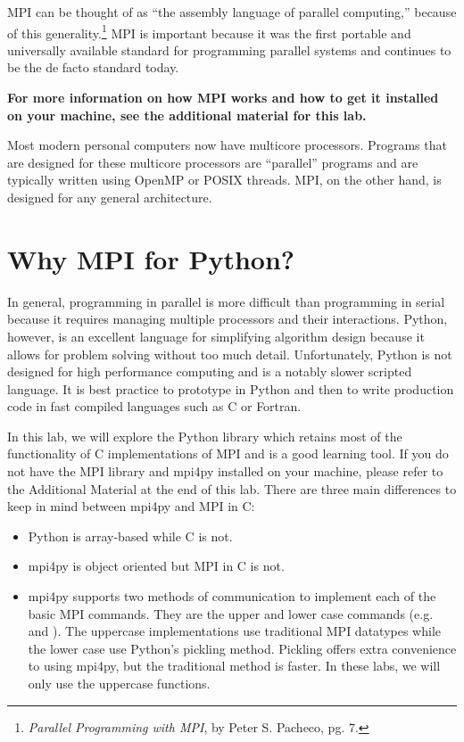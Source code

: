 MPI can be thought of as ``the assembly language of parallel computing,'' because of this generality.\footnote{\emph{Parallel Programming with MPI}, by Peter S. Pacheco, pg. 7.}
MPI is important because it was the first portable and universally available standard for programming parallel systems and continues to be the de facto standard today.

\textbf{For more information on how MPI works and how to get it installed on your machine, see the additional material for this lab.}
\begin{info}
Most modern personal computers now have multicore processors.
Programs that are designed for these multicore processors are ``parallel'' programs and are typically written using OpenMP or POSIX threads.
MPI, on the other hand, is designed for any general architecture.
\end{info}

\section*{Why MPI for Python?}
In general, programming in parallel is more difficult than programming in serial because it requires managing multiple processors and their interactions.
Python, however, is an excellent language for simplifying algorithm design because it allows for problem solving without too much detail.
Unfortunately, Python is not designed for high performance computing and is a notably slower scripted language.
It is best practice to prototype in Python and then to write production code in fast compiled languages such as C or Fortran.

In this lab, we will explore the Python library  which retains most of the functionality of C implementations of MPI and is a good learning tool.
If you do not have the MPI library and mpi4py installed on your machine, please refer to the Additional Material at the end of this lab.
There are three main differences to keep in mind between mpi4py and MPI in C:
\begin{itemize}
    \item Python is array-based while C is not.
    \item mpi4py is object oriented but MPI in C is not.
    \item mpi4py supports two methods of communication to implement each of the basic MPI commands.
    They are the upper and lower case commands (e.g.  and ).
    The uppercase implementations use traditional MPI datatypes while the lower case use
    Python's pickling method. Pickling offers extra convenience to using mpi4py,
    but the traditional method is faster. In these labs, we will only use the uppercase functions.
\end{itemize}


